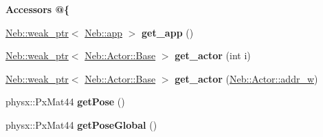 \begin{Indent}{\bf \-Accessors @\{}\par
\begin{DoxyCompactItemize}
\item 
\hypertarget{classNeb_1_1Scene_1_1scene_a5d82ad91a702fdd805dee06de5d2170d}{\hyperlink{classNeb_1_1weak__ptr}{\-Neb\-::weak\-\_\-ptr}$<$ \hyperlink{classNeb_1_1app}{\-Neb\-::app} $>$ {\bfseries get\-\_\-app} ()}\label{classNeb_1_1Scene_1_1scene_a5d82ad91a702fdd805dee06de5d2170d}

\item 
\hypertarget{classNeb_1_1Scene_1_1scene_a6f5f594c8d387e1a44701e72b5738768}{\hyperlink{classNeb_1_1weak__ptr}{\-Neb\-::weak\-\_\-ptr}$<$ \hyperlink{classNeb_1_1Actor_1_1Base}{\-Neb\-::\-Actor\-::\-Base} $>$ {\bfseries get\-\_\-actor} (int i)}\label{classNeb_1_1Scene_1_1scene_a6f5f594c8d387e1a44701e72b5738768}

\item 
\hypertarget{classNeb_1_1Scene_1_1scene_a00d85affec775718c96426c46e7e41d1}{\hyperlink{classNeb_1_1weak__ptr}{\-Neb\-::weak\-\_\-ptr}$<$ \hyperlink{classNeb_1_1Actor_1_1Base}{\-Neb\-::\-Actor\-::\-Base} $>$ {\bfseries get\-\_\-actor} (\hyperlink{classNeb_1_1weak__ptr}{\-Neb\-::\-Actor\-::addr\-\_\-w})}\label{classNeb_1_1Scene_1_1scene_a00d85affec775718c96426c46e7e41d1}

\item 
\hypertarget{classNeb_1_1Scene_1_1scene_ad6628f98e7f7c4b0241efffbf6d76cca}{physx\-::\-Px\-Mat44 {\bfseries get\-Pose} ()}\label{classNeb_1_1Scene_1_1scene_ad6628f98e7f7c4b0241efffbf6d76cca}

\item 
\hypertarget{classNeb_1_1Scene_1_1scene_a4e6ead1356ee022b0276bfa28357b682}{physx\-::\-Px\-Mat44 {\bfseries get\-Pose\-Global} ()}\label{classNeb_1_1Scene_1_1scene_a4e6ead1356ee022b0276bfa28357b682}

\end{DoxyCompactItemize}
\end{Indent}
